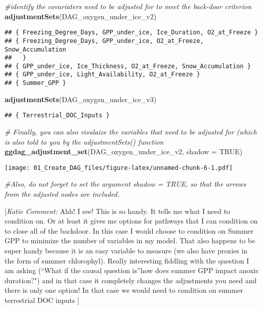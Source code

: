 \documentclass[]{article}
\newenvironment{Shaded}{\begin{snugshade}}{\end{snugshade}}
\newcommand{\CommentTok}[1]{\textcolor[rgb]{0.56,0.35,0.01}{\textit{#1}}}
\newcommand{\DataTypeTok}[1]{\textcolor[rgb]{0.13,0.29,0.53}{#1}}
\newcommand{\KeywordTok}[1]{\textcolor[rgb]{0.13,0.29,0.53}{\textbf{#1}}}
\newcommand{\NormalTok}[1]{#1}
\newcommand{\OtherTok}[1]{\textcolor[rgb]{0.56,0.35,0.01}{#1}}
\begin{document}
\begin{Shaded}
\begin{Highlighting}[]
\CommentTok{#identify the covariaters need to be adjusted for to meet the back-door criterion}
\KeywordTok{adjustmentSets}\NormalTok{(DAG_oxygen_under_ice_v2)}
\end{Highlighting}
\end{Shaded}

\begin{verbatim}
## { Freezing_Degree_Days, GPP_under_ice, Ice_Duration, O2_at_Freeze }
## { Freezing_Degree_Days, GPP_under_ice, O2_at_Freeze, Snow_Accumulation
##   }
## { GPP_under_ice, Ice_Thickness, O2_at_Freeze, Snow_Accumulation }
## { GPP_under_ice, Light_Availability, O2_at_Freeze }
## { Summer_GPP }
\end{verbatim}

\begin{Shaded}
\begin{Highlighting}[]
\KeywordTok{adjustmentSets}\NormalTok{(DAG_oxygen_under_ice_v3)}
\end{Highlighting}
\end{Shaded}

\begin{verbatim}
## { Terrestrial_DOC_Inputs }
\end{verbatim}

\begin{Shaded}
\begin{Highlighting}[]
\CommentTok{# Finally, you can also visulaize the variables that need to be adjusted for (which is also told to you by the adjustmentSets() function }
\KeywordTok{ggdag_adjustment_set}\NormalTok{(DAG_oxygen_under_ice_v2, }\DataTypeTok{shadow =} \OtherTok{TRUE}\NormalTok{) }
\end{Highlighting}
\end{Shaded}

\texttt{[image: 01\_Create\_DAG\_files/figure-latex/unnamed-chunk-6-1.pdf]}

\begin{Shaded}
\begin{Highlighting}[]
\CommentTok{#Also, do not forget to set the argument shadow = TRUE, so that the arrows from the adjusted nodes are included.}
\end{Highlighting}
\end{Shaded}

{ {[}\emph{Katie Comment:} Ahh! I see! This is so handy. It tells me
what I need to condition on. Or at least it gives me options for
pathways that I can condition on to close all of the backdoor. In this
case I would choose to condition on Summer GPP to minimize the number of
variables in my model. That also happens to be super handy because it is
an easy variable to measure (we also have proxies in the form of summer
chlorophyl). Really interesting fiddling with the question I am asking
(``What if the causal question is''how does summer GPP impact anoxic
duration?") and in that case it completely changes the adjustments you
need and there is only one option! In that case we would need to
condition on summer terrestrial DOC inputs {]} }
\end{document}
